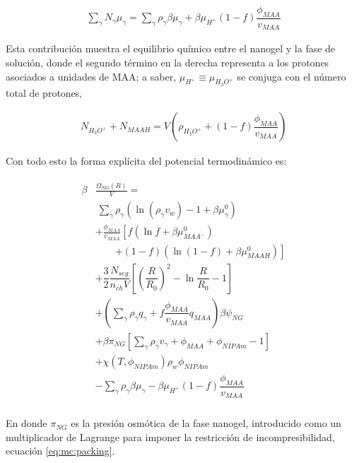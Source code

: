 	
	\begin{align}
		\sum_\gamma N_\gamma \mu_\gamma = \sum_{\gamma }{\rho_\gamma\beta\mu_\gamma}
		+ \beta\mu_{H^+}(1-f)\dfrac{\phi_{MAA}}{v_{MAA}}
	\end{align}
	
	Esta contribuci\'on muestra el equilibrio qu\'imico entre el nanogel y la fase de soluci\'on, donde el segundo t\'ermino en la derecha representa a los protones asociados a unidades de MAA;
	a saber, $\mu_{H^+}\equiv\mu_{H_3O^+}$ se conjuga con el n\'umero total de protones,
	
	\begin{align}
		N_{H_3O^+}+N_{MAAH}=V\left(\rho_{H_3O^+}+(1-f)\dfrac{\phi_{MAA}}{v_{MAA}}\right)
		\label{eq:mc:equilibrio}
	\end{align}
	
	
	
	Con todo esto la forma expl\'icita del potencial termodin\'amico es:
	
	
	
	
	\begin{align}
		\begin{aligned}
			\beta&\frac{\Omega_{NG}(R)}{V}=\\& ~ \sum_{\gamma} \rho_\gamma\left(\ln\left(\rho_\gamma v_w\right) -1 + \beta\mu^0_\gamma\right) \\
			& + \frac{\phi_{MAA}}{v_{MAA}} \left[f(\ln f+ \beta\mu^0_{MAA^-})\right.\\
			&\qquad\left.+(1-f)(\ln (1-f)+\beta\mu^0_{MAAH})\right] \\
			& + \dfrac{3}{2}\dfrac{N_{seg}}{n_{ch} V}\left[\left(\dfrac{R}{R_0}\right)^2 - \ln\dfrac{R}{R_0} -1\right] \\
			& +  \left(\sum_{\gamma } {\rho_\gamma q_\gamma + f\dfrac{\phi_{MAA}}{v_{MAA}}q_{MAA}}\right)\beta\psi_{NG}\\
			& +\beta\pi_{NG} \left[ \sum_{\gamma } \rho_\gamma v_\gamma  + \phi_{MAA} + \phi_{NIPAm} -1 \right] \\
			& + \chi (T, \phi_{NIPAm})\rho_w \phi_{NIPAm} \\
			& -\sum_{\gamma }{\rho_\gamma\beta\mu_\gamma}
			-\beta\mu_{H^+}(1-f)\dfrac{\phi_{MAA}}{v_{MAA}}\\
		\end{aligned}
		\label{eq:mc:free-energy}
	\end{align}
	
	
	
	
	\noindent En donde $\pi_{NG}$ es la presi\'on osm\'otica de la fase nanogel, introducido como un multiplicador de Lagrange para imponer la restricci\'on de incompresibilidad, ecuaci\'on \ref{eq:mc:packing}.
	
